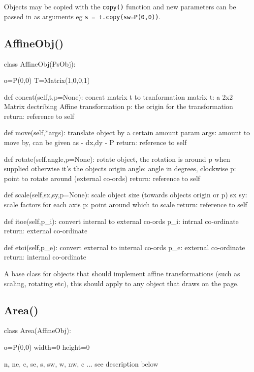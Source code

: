 \documentclass[a4paper]{book}
\begin{document}
Objects may be copied with the \Verb|copy()| function and new
parameters can be passed in as arguments eg \Verb|s = t.copy(sw=P(0,0))|.

\subsection{AffineObj()}
\label{sec:affineobj}
\begin{python}
class AffineObj(PsObj):

    o=P(0,0)
    T=Matrix(1,0,0,1)

    def concat(self,t,p=None):
        concat matrix t to tranformation matrix
          t: a 2x2 Matrix dectribing Affine transformation
          p: the origin for the transformation
          return: reference to self

    def move(self,*args):
        translate object by a certain amount
          param args: amount to move by, can be given as
            - dx,dy
            - P
          return: reference to self

    def rotate(self,angle,p=None):
        rotate object, 
        the rotation is around p when supplied otherwise
        it's the objects origin
          angle: angle in degrees, clockwise
          p: point to rotate around (external co-ords)
          return: reference to self

    def scale(self,sx,sy,p=None):
        scale object size (towards objects origin or p)
          sx sy: scale factors for each axis
          p: point around which to scale
          return: reference to self

    def itoe(self,p_i):
        convert internal to external co-ords
          p_i: intrnal co-ordinate
          return: external co-ordinate
        
    def etoi(self,p_e):
        convert external to internal co-ords
          p_e: external co-ordinate
          return: internal co-ordinate
\end{python}

A base class for objects that should implement affine transformations
(such as scaling, rotating etc), this should apply to any object that
draws on the page.


\subsection{Area()}
\label{sec:area}
\begin{python}
class Area(AffineObj):

    o=P(0,0)
    width=0
    height=0

    n, ne, e, se, s, sw, w, nw, c  ... see description below
\end{python}
\end{document}
